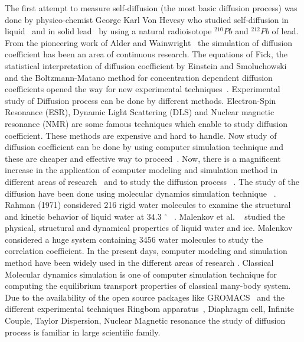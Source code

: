The first attempt to measure self-diffusion (the most basic diffusion process) was done by physico-chemist George Karl Von Hevesy who studied self-diffusion in liquid~\citep{groh1920} and in solid lead~ \citep{groh1921} by using a natural radioisotope  $^{210}Pb$ and $^{212}Pb$ of lead. From the pioneering work of Alder and Wainwright~\citep{PhysRevLett1967, alder1970}  the simulation of diffusion coefficient has been an area of continuous research. The equations of Fick, the statistical interpretation of diffusion coefficient by Einstein and Smoluchowski and the Boltzmann-Matano method for concentration dependent diffusion coefficients opened the way for new experimental techniques~\citep{mehrer2009}. Experimental study of Diffusion process can be done by different methods. Electron-Spin Resonance (ESR), Dynamic Light Scattering (DLS) and Nuclear magnetic resonance (NMR) are some famous techniques which enable to study diffusion coefficient. These methods are expensive and hard to handle. Now study of diffusion coefficient can be done by using computer simulation technique and these are cheaper and effective way to proceed~\citep{Allen1989}. Now, there is a magnificent increase in the application of computer modeling and simulation method in different areas of research~\citep{adhikari2003, adhikari2002, Leach2001} and to study the diffusion process ~\citep{harmandaris2007}. The study of the diffusion  have been done using
molecular dynamics simulation technique ~\citep{Thapa2013, dahal2012}. Rahman (1971) considered 216 rigid water molecules to examine the structural and kinetic behavior of liquid water at $34.3$ $^{\circ}$~ \citep{rahman1971}. Malenkov et al. ~\citep{malenkov2009, malenkov2011} studied the physical, structural and dynamical properties of liquid water and ice. Malenkov considered a huge system containing 3456 water molecules to study the correlation coefficient. In the present days, computer modeling and simulation method have been widely used in the different areas of research \citep{bird2015introductory}. Classical Molecular dynamics simulation is one of computer simulation technique for computing the equilibrium transport properties of classical many-body system. Due to the availability of the open source packages like GROMACS~\citep{Gromacs-manual}  and the different experimental techniques Ringbom apparatus~\citep{smith1955experimental}, Diaphragm cell, Infinite Couple, Taylor Dispersion, Nuclear Magnetic resonance \citep{cussler2009}  the study of diffusion process is familiar in large scientific family. 

